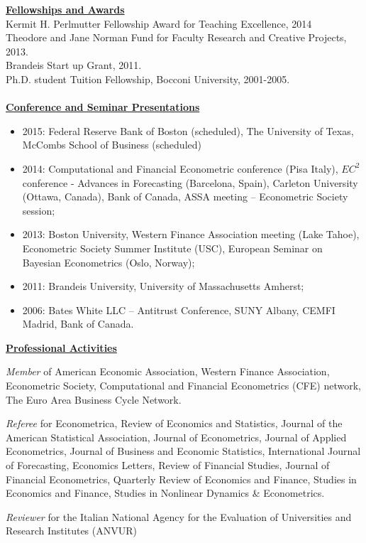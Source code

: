 \documentclass[12pt]{article}
\begin{document}
\underline{\textbf{Fellowships and Awards}}\\
Kermit H. Perlmutter Fellowship Award for Teaching Excellence, 2014 \\
Theodore and Jane Norman Fund for Faculty Research and Creative Projects, 2013. \\
Brandeis Start up Grant, 2011. \\
Ph.D. student Tuition Fellowship, Bocconi University, 2001-2005.\\ \\
\underline{\textbf{Conference and Seminar Presentations}}
\begin{itemize}
  \item 2015: Federal Reserve Bank of Boston (scheduled), The University of Texas, McCombs School of Business (scheduled)
	\item 2014: Computational and Financial Econometric conference (Pisa Italy), $EC^2$ conference - Advances in Forecasting (Barcelona, Spain),  Carleton University (Ottawa, Canada), Bank of Canada, ASSA meeting -- Econometric Society session;  
	\item 2013: Boston University, Western Finance Association meeting (Lake Tahoe), Econometric Society Summer Institute (USC), European Seminar on Bayesian Econometrics (Oslo, Norway); 
	\item 2011: Brandeis University, University of Massachusetts Amherst; 
	\item 2006: Bates White LLC -- Antitrust Conference, SUNY Albany, CEMFI Madrid, Bank of Canada.
\end{itemize}

\underline{\textbf{Professional Activities}}
\begin{description}
\item\emph{Member} of American Economic Association, Western Finance Association, Econometric Society, Computational and Financial Econometrics (CFE) network, The Euro Area Business Cycle Network.

\item \emph{Referee} for Econometrica, Review of Economics and Statistics, Journal of the American Statistical Association, Journal of Econometrics, Journal of Applied Econometrics, Journal of Business and Economic Statistics, International Journal of Forecasting, Economics Letters, Review of Financial Studies, Journal of Financial Econometrics, Quarterly Review of Economics and Finance, Studies in Economics and Finance, Studies in Nonlinear Dynamics & Econometrics.

\item \emph{Reviewer} for the Italian National Agency for the Evaluation of Universities and Research Institutes (ANVUR) 
\end{description}
 
\end{document}
